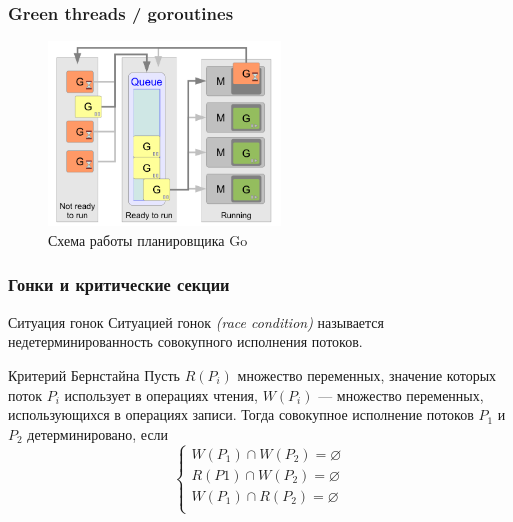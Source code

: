 \documentclass[aspectratio=169, pdf, 8pt, unicode]{beamer}
\begin{document}
\begin{frame}[fragile]
\frametitle{Green threads / goroutines}
\begin{figure}[H]
      \centering
		\includegraphics[width=0.55\textwidth]{fig/goroutines.png}
      \caption{Схема работы планировщика Go}
\end{figure}
\end{frame}


\begin{frame}
\frametitle{Гонки и критические секции}
\begin{block}{Ситуация гонок}
	Ситуацией гонок \textit{(race condition)} называется недетерминированность совокупного исполнения потоков.
\end{block}
\begin{block}{Критерий Бернстайна}
	Пусть $R(P_i)$ множество переменных, значение которых поток $P_i$ использует в операциях чтения, $W(P_i)$ ---
	множество переменных, использующихся в операциях записи. Тогда совокупное исполнение потоков $P_1$ и $P_2$ детерминировано, если
	\begin{equation}
	\left\{
	\begin{aligned}
		W(P_1) \cap W(P_2) = \varnothing \\
		R(P1)  \cap W(P_2) = \varnothing \\
		W(P_1) \cap R(P_2) = \varnothing \\
	\end{aligned}
	\right.
   \end{equation}
\end{block}
\end{frame}
\end{document}
